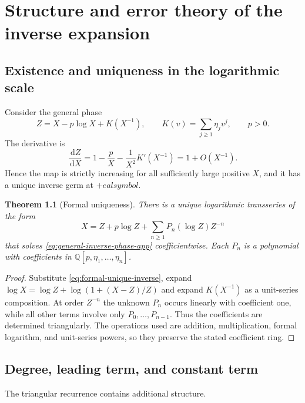\documentclass[11pt,a4paper,oneside,openany]{book}
\newtheorem{theorem}{Theorem}[chapter]
\theoremstyle{definition}
\theoremstyle{remark}
\newcommand{\dd}{\,\mathrm d}
\begin{document}
\chapter{Structure and error theory of the inverse expansion}
\label{app:inverse-structure}

\section{Existence and uniqueness in the logarithmic scale}
Consider the general phase
\begin{equation}
 Z=X-p\log X+K(X^{-1}),
 \qquad
 K(v)=\sum_{j\ge1}\eta_jv^j,
 \qquad p>0.
 \label{eq:general-inverse-phase-app}
\end{equation}
The derivative is
\begin{equation}
 \frac{\dd Z}{\dd X}
 =1-\frac pX-\frac1{X^2}K'(X^{-1})=1+O(X^{-1}).
 \label{eq:phase-derivative-app}
\end{equation}
Hence the map is strictly increasing for all sufficiently large positive $X$,
and it has a unique inverse germ at $+
ealsymbol$.

\begin{theorem}[Formal uniqueness]
There is a unique logarithmic transseries of the form
\begin{equation}
 X=Z+p\log Z+\sum_{n\ge1}P_n(\log Z)Z^{-n}
 \label{eq:formal-unique-inverse}
\end{equation}
that solves \cref{eq:general-inverse-phase-app} coefficientwise.  Each $P_n$ is
a polynomial with coefficients in
$\mathbb Q[p,\eta_1,\ldots,\eta_n]$.
\end{theorem}

\begin{proof}
Substitute \cref{eq:formal-unique-inverse}, expand
$\log X=\log Z+\log(1+(X-Z)/Z)$ and expand $K(X^{-1})$ as a unit-series
composition.  At order $Z^{-n}$ the unknown $P_n$ occurs linearly with
coefficient one, while all other terms involve only $P_0,\ldots,P_{n-1}$.
Thus the coefficients are determined triangularly.  The operations used are
addition, multiplication, formal logarithm, and unit-series powers, so they
preserve the stated coefficient ring.
\end{proof}

\section{Degree, leading term, and constant term}
The triangular recurrence contains additional structure.
\end{document}
